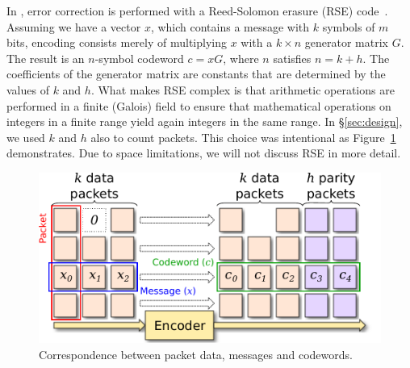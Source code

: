 
In \OurSys, error correction is performed with a Reed-Solomon erasure (RSE) code~\cite{rse}.
Assuming we have a vector $x$,
which contains a message with $k$ symbols of $m$ bits, encoding consists merely
of multiplying $x$ with a $k \times n$ generator matrix $G$. The result is an
$n$-symbol codeword $c = xG$, where $n$ satisfies $n = k + h$.   The coefficients of the
generator matrix are constants that are determined by the values of $k$ and
$h$.
What makes RSE complex is that arithmetic operations are performed in a finite (Galois)
field to ensure that mathematical operations on integers in a finite range yield
again integers in the same range.
In \S\ref{sec:design}, we used $k$ and $h$ also to count packets.  This choice was intentional as
Figure~\ref{fig:Striping} demonstrates.
Due to space limitations, we will not discuss RSE in more detail.

\begin{figure}
  \centering
  \includegraphics[width=0.4\paperwidth]{Striping.pdf}
  \caption{\label{fig:Striping} Correspondence between packet data, messages and codewords.
  }
\end{figure}

